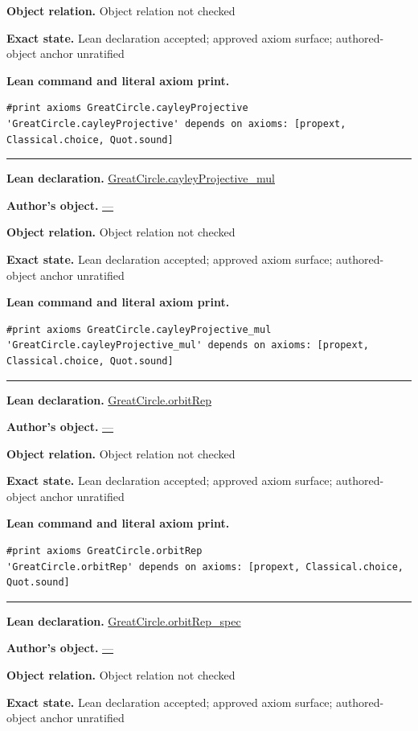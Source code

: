 \documentclass[11pt]{article}
\theoremstyle{plain}
\theoremstyle{definition}
\theoremstyle{remark}
\begin{document}
\begin{tcolorbox}
\par\textbf{Object relation.} Object relation not checked
\par\textbf{Exact state.} Lean declaration accepted; approved axiom surface; authored-object anchor unratified
\par\smallskip\textbf{Lean command and literal axiom print.}
\begin{Verbatim}[breaklines=true,breakanywhere=true,fontsize=\small]
#print axioms GreatCircle.cayleyProjective
'GreatCircle.cayleyProjective' depends on axioms: [propext, Classical.choice, Quot.sound]
\end{Verbatim}
\medskip\hrule\medskip
\textbf{Lean declaration.} \url{GreatCircle.cayleyProjective_mul}
\par\textbf{Author's object.} \url{—}
\par\textbf{Object relation.} Object relation not checked
\par\textbf{Exact state.} Lean declaration accepted; approved axiom surface; authored-object anchor unratified
\par\smallskip\textbf{Lean command and literal axiom print.}
\begin{Verbatim}[breaklines=true,breakanywhere=true,fontsize=\small]
#print axioms GreatCircle.cayleyProjective_mul
'GreatCircle.cayleyProjective_mul' depends on axioms: [propext, Classical.choice, Quot.sound]
\end{Verbatim}
\medskip\hrule\medskip
\textbf{Lean declaration.} \url{GreatCircle.orbitRep}
\par\textbf{Author's object.} \url{—}
\par\textbf{Object relation.} Object relation not checked
\par\textbf{Exact state.} Lean declaration accepted; approved axiom surface; authored-object anchor unratified
\par\smallskip\textbf{Lean command and literal axiom print.}
\begin{Verbatim}[breaklines=true,breakanywhere=true,fontsize=\small]
#print axioms GreatCircle.orbitRep
'GreatCircle.orbitRep' depends on axioms: [propext, Classical.choice, Quot.sound]
\end{Verbatim}
\medskip\hrule\medskip
\textbf{Lean declaration.} \url{GreatCircle.orbitRep_spec}
\par\textbf{Author's object.} \url{—}
\par\textbf{Object relation.} Object relation not checked
\par\textbf{Exact state.} Lean declaration accepted; approved axiom surface; authored-object anchor unratified

\end{tcolorbox}
\end{document}
